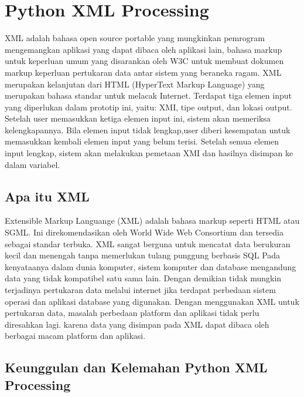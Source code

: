 

\section{Python XML Processing}
  XML adalah bahasa open source portable yang mungkinkan pemrogram mengemangkan aplikasi yang dapat dibaca oleh aplikasi lain, bahasa markup untuk keperluan umum yang disarankan oleh W3C untuk membuat dokumen markup keperluan pertukaran data antar sistem yang beraneka ragam. XML merupakan kelanjutan dari HTML (HyperText Markup Language) yang merupakan bahasa standar untuk melacak Internet.
  Terdapat tiga elemen input yang diperlukan dalam prototip ini, yaitu: XMI, tipe output, dan lokasi output. 
Setelah user memasukkan ketiga elemen input ini, sistem akan memeriksa kelengkapannya. Bila elemen input tidak lengkap,user diberi kesempatan untuk memasukkan kembali elemen input yang belum terisi. Setelah semua elemen input lengkap, sistem akan melakukan pemetaan XMI dan hasilnya disimpan ke dalam variabel.
\subsection{Apa itu XML}
  Extensible Markup Languange (XML) adalah bahasa markup seperti HTML atau SGML. 
Ini direkomendasikan oleh World Wide Web Consortium dan tersedia sebagai standar terbuka.
XML sangat berguna untuk mencatat data berukuran kecil dan menengah tanpa memerlukan tulang punggung berbasis SQL  
Pada kenyataanya dalam dunia komputer, sistem komputer dan database mengandung data yang tidak kompatibel satu sama lain. Dengan demikian tidak mungkin terjadinya pertukaran data melalui internet jika terdapat perbedaan sistem operasi dan aplikasi database yang digunakan.
Dengan menggunakan XML untuk pertukaran data, masalah perbedaan platform dan aplikasi tidak perlu diresahkan lagi. karena data yang disimpan pada XML dapat dibaca oleh berbagai macam platform dan aplikasi.

\subsection{Keunggulan dan Kelemahan Python XML Processing}
